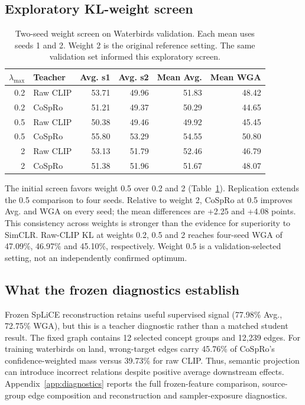 \documentclass{article}
\begin{document}
\subsection{Exploratory KL-weight screen}
\begin{table}[t]
\centering
\caption{Two-seed weight screen on Waterbirds validation. Each mean uses seeds
1 and 2. Weight 2 is the original reference setting.
The same validation set informed this exploratory screen.}
\begin{tabular}{rlrrrr}
\toprule
$\lambda_{\max}$ & Teacher & Avg. s1 & Avg. s2 & Mean Avg. & Mean WGA \\
\midrule
0.2 & Raw CLIP & 53.71 & 49.96 & 51.83 & 48.42 \\
0.2 & CoSpRo & 51.21 & 49.37 & 50.29 & 44.65 \\
0.5 & Raw CLIP & 50.38 & 49.46 & 49.92 & 45.45 \\
0.5 & CoSpRo & 55.80 & 53.29 & 54.55 & 50.80 \\
2 & Raw CLIP & 53.13 & 51.79 & 52.46 & 46.79 \\
2 & CoSpRo & 51.38 & 51.96 & 51.67 & 48.07 \\
\bottomrule
\end{tabular}
\label{tab:weights}
\end{table}

The initial screen favors weight 0.5 over 0.2 and 2
(Table~\ref{tab:weights}). Replication extends the 0.5 comparison to four
seeds. Relative to weight 2, CoSpRo at 0.5 improves Avg. and WGA on every
seed; the mean differences are +2.25 and +4.08 points. This consistency across
weights is stronger than the evidence for superiority to SimCLR. Raw-CLIP KL
at weights 0.2, 0.5 and 2 reaches four-seed WGA of 47.09\%, 46.97\% and
45.10\%, respectively. Weight 0.5 is a validation-selected setting, not an
independently confirmed optimum.

\subsection{What the frozen diagnostics establish}
Frozen SpLiCE reconstruction retains useful supervised signal (77.98\%
Avg., 72.75\% WGA), but this is a teacher diagnostic rather than a matched
student result. The fixed graph contains 12 selected concept groups and
12,239 edges. For training waterbirds on land, wrong-target edges carry
45.76\% of CoSpRo's confidence-weighted mass versus 39.73\% for raw CLIP.
Thus, semantic projection can introduce incorrect relations despite positive
average downstream effects. Appendix~\ref{app:diagnostics} reports the full
frozen-feature comparison, source-group edge composition and reconstruction
and sampler-exposure diagnostics.
\end{document}
